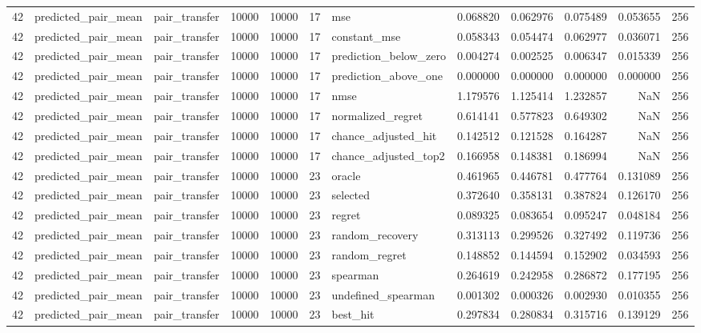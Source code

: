 \begin{tabular}{rllrrrlrrrrr}
42 & predicted_pair_mean & pair_transfer & 10000 & 10000 & 17 & mse & 0.068820 & 0.062976 & 0.075489 & 0.053655 & 256 \\
42 & predicted_pair_mean & pair_transfer & 10000 & 10000 & 17 & constant_mse & 0.058343 & 0.054474 & 0.062977 & 0.036071 & 256 \\
42 & predicted_pair_mean & pair_transfer & 10000 & 10000 & 17 & prediction_below_zero & 0.004274 & 0.002525 & 0.006347 & 0.015339 & 256 \\
42 & predicted_pair_mean & pair_transfer & 10000 & 10000 & 17 & prediction_above_one & 0.000000 & 0.000000 & 0.000000 & 0.000000 & 256 \\
42 & predicted_pair_mean & pair_transfer & 10000 & 10000 & 17 & nmse & 1.179576 & 1.125414 & 1.232857 & NaN & 256 \\
42 & predicted_pair_mean & pair_transfer & 10000 & 10000 & 17 & normalized_regret & 0.614141 & 0.577823 & 0.649302 & NaN & 256 \\
42 & predicted_pair_mean & pair_transfer & 10000 & 10000 & 17 & chance_adjusted_hit & 0.142512 & 0.121528 & 0.164287 & NaN & 256 \\
42 & predicted_pair_mean & pair_transfer & 10000 & 10000 & 17 & chance_adjusted_top2 & 0.166958 & 0.148381 & 0.186994 & NaN & 256 \\
42 & predicted_pair_mean & pair_transfer & 10000 & 10000 & 23 & oracle & 0.461965 & 0.446781 & 0.477764 & 0.131089 & 256 \\
42 & predicted_pair_mean & pair_transfer & 10000 & 10000 & 23 & selected & 0.372640 & 0.358131 & 0.387824 & 0.126170 & 256 \\
42 & predicted_pair_mean & pair_transfer & 10000 & 10000 & 23 & regret & 0.089325 & 0.083654 & 0.095247 & 0.048184 & 256 \\
42 & predicted_pair_mean & pair_transfer & 10000 & 10000 & 23 & random_recovery & 0.313113 & 0.299526 & 0.327492 & 0.119736 & 256 \\
42 & predicted_pair_mean & pair_transfer & 10000 & 10000 & 23 & random_regret & 0.148852 & 0.144594 & 0.152902 & 0.034593 & 256 \\
42 & predicted_pair_mean & pair_transfer & 10000 & 10000 & 23 & spearman & 0.264619 & 0.242958 & 0.286872 & 0.177195 & 256 \\
42 & predicted_pair_mean & pair_transfer & 10000 & 10000 & 23 & undefined_spearman & 0.001302 & 0.000326 & 0.002930 & 0.010355 & 256 \\
42 & predicted_pair_mean & pair_transfer & 10000 & 10000 & 23 & best_hit & 0.297834 & 0.280834 & 0.315716 & 0.139129 & 256 \\

\end{tabular}
